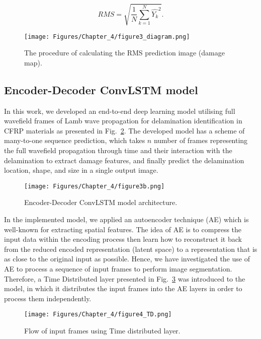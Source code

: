 \begin{equation}
	RMS = \sqrt{\frac{1}{N}\sum_{k=1}^{N}\hat{Y_k}^2}.	
	\label{RMS}
\end{equation}
\begin{figure}[!h]
	\centering
	\texttt{[image: Figures/Chapter\_4/figure3\_diagram.png]}
	\caption{The procedure of calculating the RMS prediction image (damage map).}
	\label{fig:Diagram_exp_predictions}
\end{figure}
\subsection{Encoder-Decoder ConvLSTM model}
\label{proposed_approach}
In this work, we developed an end-to-end deep learning model utilising full wavefield frames of Lamb wave propagation for delamination identification in CFRP materials as presented in Fig.~\ref{fig:proposed_convLSTM_model}.
The developed model has a scheme of many-to-one sequence prediction, which takes \(n\) number of frames representing the full wavefield propagation through time and their interaction with the delamination to extract damage features, and finally predict the delamination location, shape, and size in a single output image.
\begin{figure} [!h]
	\centering
	\texttt{[image: Figures/Chapter\_4/figure3b.png]}
	\caption{Encoder-Decoder ConvLSTM model architecture.}
	\label{fig:proposed_convLSTM_model}
\end{figure} 

In the implemented model, we applied an autoencoder technique (AE) which is well-known for extracting spatial features.
The idea of AE is to compress the input data within the encoding process then learn how to reconstruct it back from the reduced encoded representation (latent space) to a representation that is as close to the original input as possible. 
Hence, we have investigated the use of AE to process a sequence of input frames to perform image segmentation.
Therefore, a Time Distributed layer presented in Fig.~\ref{fig:TD} was introduced to the model, in which it distributes the input frames into the AE layers in order to process them independently.
\begin{figure}[!h]
	\centering
	\texttt{[image: Figures/Chapter\_4/figure4\_TD.png]}
	\caption{Flow of input frames using Time distributed layer.}
	\label{fig:TD}
\end{figure}

